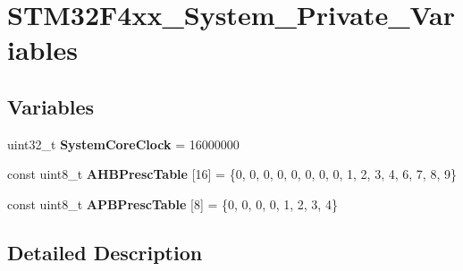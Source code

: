 \hypertarget{group__STM32F4xx__System__Private__Variables}{}\section{S\+T\+M32\+F4xx\+\_\+\+System\+\_\+\+Private\+\_\+\+Variables}
\label{group__STM32F4xx__System__Private__Variables}
\subsection*{Variables}
\begin{DoxyCompactItemize}
\item 
\mbox{\label{group__STM32F4xx__System__Private__Variables_gaa3cd3e43291e81e795d642b79b6088e6}} 
uint32\+\_\+t {\bfseries System\+Core\+Clock} = 16000000
\item 
\mbox{\label{group__STM32F4xx__System__Private__Variables_ga6e1d9cd666f0eacbfde31e9932a93466}} 
const uint8\+\_\+t {\bfseries A\+H\+B\+Presc\+Table} \mbox{[}16\mbox{]} = \{0, 0, 0, 0, 0, 0, 0, 0, 1, 2, 3, 4, 6, 7, 8, 9\}
\item 
\mbox{\label{group__STM32F4xx__System__Private__Variables_ga5b4f8b768465842cf854a8f993b375e9}} 
const uint8\+\_\+t {\bfseries A\+P\+B\+Presc\+Table} \mbox{[}8\mbox{]} = \{0, 0, 0, 0, 1, 2, 3, 4\}
\end{DoxyCompactItemize}


\subsection{Detailed Description}
